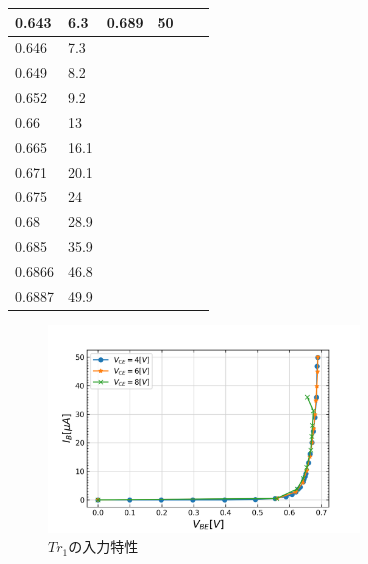 \documentclass[10pt, a4j, dvipdfmx]{jarticle}
\begin{document}
\begin{table}[H]
\begin{tabular}{|l|l||l|l||l|l|}
        0.643                   & 6.3      & 0.689                   & 50       &                        &         \\ \hline
        0.646                   & 7.3      &                        &         &                        &         \\ \hline
        0.649                   & 8.2      &                        &         &                        &         \\ \hline
        0.652                   & 9.2      &                        &         &                        &         \\ \hline
        0.66                    & 13       &                        &         &                        &         \\ \hline
        0.665                   & 16.1     &                        &         &                        &         \\ \hline
        0.671                   & 20.1     &                        &         &                        &         \\ \hline
        0.675                   & 24       &                        &         &                        &         \\ \hline
        0.68                    & 28.9     &                        &         &                        &         \\ \hline
        0.685                   & 35.9     &                        &         &                        &         \\ \hline
        0.6866                  & 46.8     &                        &         &                        &         \\ \hline
        0.6887                  & 49.9     &                        &         &                        &         \\ \hline
        \end{tabular}
        \normalsize
    \end{table}
    \begin{figure}[H]
        \centering
        \includegraphics[height=55mm]{ex-1.png}
        \caption{$Tr_1$の入力特性}
        \label{ex:1}    
    \end{figure}
    
\end{document}
